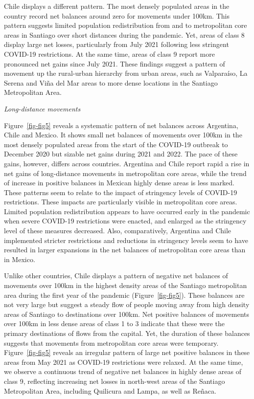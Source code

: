 \documentclass[
  11pt,
]{article}
\begin{document}
Chile displays a different pattern. The most densely populated areas in
the country record net balances around zero for movements under 100km.
This pattern suggests limited population redistribution from and to
metropolitan core areas in Santiago over short distances during the
pandemic. Yet, areas of class 8 display large net losses, particularly
from July 2021 following less stringent COVID-19 restrictions. At the
same time, areas of class 9 report more pronounced net gains since July
2021. These findings suggest a pattern of movement up the rural-urban
hierarchy from urban areas, such as Valparaíso, La Serena and Viña del
Mar areas to more dense locations in the Santiago Metropolitan Area.

\emph{Long-distance movements}

Figure~\ref{fig-fig5} reveals a systematic pattern of net balances
across Argentina, Chile and Mexico. It shows small net balances of
movements over 100km in the most densely populated areas from the start
of the COVID-19 outbreak to December 2020 but sizable net gains during
2021 and 2022. The pace of these gains, however, differs across
countries. Argentina and Chile report rapid a rise in net gains of
long-distance movements in metropolitan core areas, while the trend of
increase in positive balances in Mexican highly dense areas is less
marked. These patterns seem to relate to the impact of stringency levels
of COVID-19 restrictions. These impacts are particularly visible in
metropolitan core areas. Limited population redistribution appears to
have occurred early in the pandemic when severe COVID-19 restrictions
were enacted, and enlarged as the stringency level of these measures
decreased. Also, comparatively, Argentina and Chile implemented stricter
restrictions and reductions in stringency levels seem to have resulted
in larger expansions in the net balances of metropolitan core areas than
in Mexico.

Unlike other countries, Chile displays a pattern of negative net
balances of movements over 100km in the highest density areas of the
Santiago metropolitan area during the first year of the pandemic
(Figure~\ref{fig-fig5}). These balances are not very large but suggest a
steady flow of people moving away from high density areas of Santiago to
destinations over 100km. Net positive balances of movements over 100km
in less dense areas of class 1 to 3 indicate that these were the primary
destinations of flows from the capital. Yet, the duration of these
balances suggests that movements from metropolitan core areas were
temporary. Figure~\ref{fig-fig5} reveals an irregular pattern of large
net positive balances in these areas from May 2021 as COVID-19
restrictions were relaxed. At the same time, we observe a continuous
trend of negative net balances in highly dense areas of class 9,
reflecting increasing net losses in north-west areas of the Santiago
Metropolitan Area, including Quilicura and Lampa, as well as Reñaca.
\end{document}
